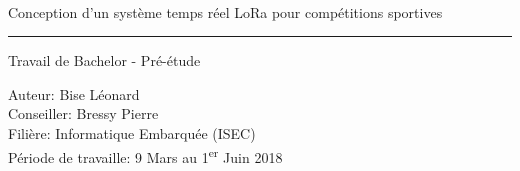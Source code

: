 \thispagestyle{empty}

\sffamily


\large

~\vspace{\fill}

\begin{center}
{\HUGE 
Conception d'un système temps réel LoRa pour compétitions sportives
}
\vspace{1cm}
\hrule
\vspace{1cm}
{\LARGE
Travail de Bachelor - Pré-étude
}
\end{center}

\vspace{3.5cm}

\begin{flushleft}
Auteur: Bise Léonard\\
Conseiller: Bressy Pierre\\
Filière: Informatique Embarquée (ISEC)\\
Période de travaille: 9 Mars au 1\textsuperscript{er} Juin 2018
\end{flushleft}

\vspace{\fill}

\cleardoublepage